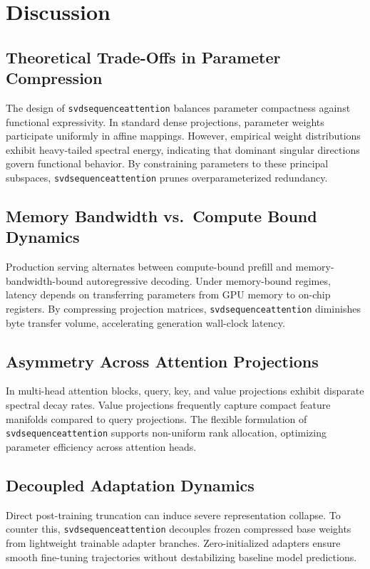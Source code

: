 \section{Discussion}

\subsection{Theoretical Trade-Offs in Parameter Compression}
The design of \texttt{svdsequenceattention} balances parameter compactness against functional expressivity. In standard dense projections, parameter weights participate uniformly in affine mappings. However, empirical weight distributions exhibit heavy-tailed spectral energy, indicating that dominant singular directions govern functional behavior. By constraining parameters to these principal subspaces, \texttt{svdsequenceattention} prunes overparameterized redundancy.

\subsection{Memory Bandwidth vs.\ Compute Bound Dynamics}
Production serving alternates between compute-bound prefill and memory-bandwidth-bound autoregressive decoding. Under memory-bound regimes, latency depends on transferring parameters from GPU memory to on-chip registers. By compressing projection matrices, \texttt{svdsequenceattention} diminishes byte transfer volume, accelerating generation wall-clock latency.

\subsection{Asymmetry Across Attention Projections}
In multi-head attention blocks, query, key, and value projections exhibit disparate spectral decay rates. Value projections frequently capture compact feature manifolds compared to query projections. The flexible formulation of \texttt{svdsequenceattention} supports non-uniform rank allocation, optimizing parameter efficiency across attention heads.

\subsection{Decoupled Adaptation Dynamics}
Direct post-training truncation can induce severe representation collapse. To counter this, \texttt{svdsequenceattention} decouples frozen compressed base weights from lightweight trainable adapter branches. Zero-initialized adapters ensure smooth fine-tuning trajectories without destabilizing baseline model predictions.

